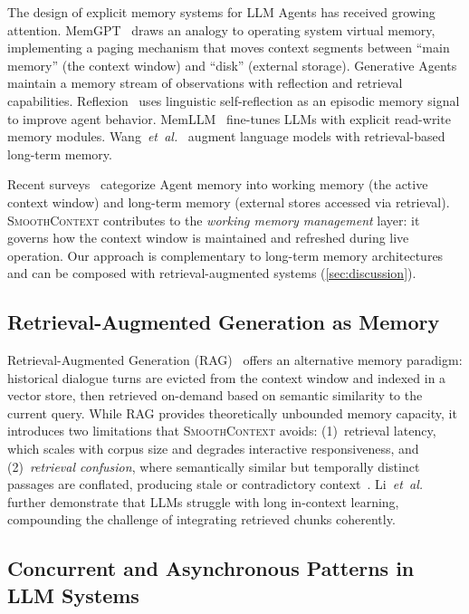 \documentclass[10pt,twocolumn]{article}
\newcommand{\sys}{\textsc{SmoothContext}}
\newcommand{\etal}{\textit{et~al.}}
\begin{document}
The design of explicit memory systems for LLM Agents has received growing attention. MemGPT~\cite{packer2023memgpt} draws an analogy to operating system virtual memory, implementing a paging mechanism that moves context segments between ``main memory'' (the context window) and ``disk'' (external storage). Generative Agents~\cite{park2023generative} maintain a memory stream of observations with reflection and retrieval capabilities. Reflexion~\cite{shinn2023reflexion} uses linguistic self-reflection as an episodic memory signal to improve agent behavior. MemLLM~\cite{modarressi2024memllm} fine-tunes LLMs with explicit read-write memory modules. Wang~\etal~\cite{wang2024augmenting} augment language models with retrieval-based long-term memory.

Recent surveys~\cite{zhang2024survey} categorize Agent memory into working memory (the active context window) and long-term memory (external stores accessed via retrieval). \sys{} contributes to the \emph{working memory management} layer: it governs how the context window is maintained and refreshed during live operation. Our approach is complementary to long-term memory architectures and can be composed with retrieval-augmented systems (\cref{sec:discussion}).

\subsection{Retrieval-Augmented Generation as Memory}

Retrieval-Augmented Generation (RAG)~\cite{lewis2020retrieval, gao2024retrieval} offers an alternative memory paradigm: historical dialogue turns are evicted from the context window and indexed in a vector store, then retrieved on-demand based on semantic similarity to the current query. While RAG provides theoretically unbounded memory capacity, it introduces two limitations that \sys{} avoids: (1)~retrieval latency, which scales with corpus size and degrades interactive responsiveness, and (2)~\emph{retrieval confusion}, where semantically similar but temporally distinct passages are conflated, producing stale or contradictory context~\cite{liu2024lost}. Li~\etal~\cite{li2024long} further demonstrate that LLMs struggle with long in-context learning, compounding the challenge of integrating retrieved chunks coherently.

\subsection{Concurrent and Asynchronous Patterns in LLM Systems}
\end{document}
